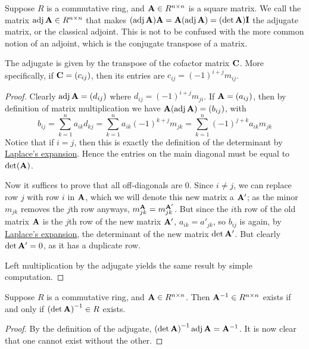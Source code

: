 \begin{definition}
    Suppose \(R\) is a commutative ring,
    and \(\vb{A} \in R^{n \times n}\) is a square matrix.
    We call the matrix \(\operatorname{adj}\vb{A} \in R^{n \times n}\)
    that makes \((\operatorname{adj}\vb{A})\vb{A} = \vb{A}(\operatorname{adj}\vb{A}) = (\det\vb{A})\vb{I}\)
    the adjugate matrix, or the classical adjoint.
    This is not to be confused with the more common notion of an adjoint,
    which is the conjugate transpose of a matrix.
\end{definition}
\begin{proposition}
    The adjugate is given by the transpose of the cofactor matrix \(\vb{C}\).
    More specifically, if \(\vb{C} = (c_{ij})\),
    then its entries are \(c_{ij} = {(-1)}^{i+j}m_{ij}\).
\end{proposition}
\begin{proof}
    Clearly \(\operatorname{adj}\vb{A} = (d_{ij})\)
    where \(d_{ij} = {(-1)}^{i+j}m_{ji}\).
    If \(\vb{A} = (a_{ij})\),
    then by definition of matrix multiplication we have
    \(\vb{A}(\operatorname{adj}\vb{A}) = (b_{ij})\), with
    \begin{equation*}
        b_{ij} = \sum_{k=1}^n a_{ik}d_{kj}
        = \sum_{k=1}^n a_{ik} {(-1)}^{k+j}m_{jk}
        = \sum_{k=1}^n {(-1)}^{j+k} a_{ik}m_{jk}
    \end{equation*}
    Notice that if \(i=j\),
    then this is exactly the definition of the determinant
    by \hyperref[thm:laplace-expansion-det]{Laplace's expansion}.
    Hence the entries on the main diagonal must be equal to \(\det(\vb{A})\).
    
    Now it suffices to prove that all off-diagonals are 0.
    Since \(i \neq j\), we can replace row \(j\) with row \(i\) in \(\vb{A}\),
    which we will denote this new matrix a \(\vb{A'}\);
    as the minor \(m_{jk}\) removes the \(j\)th row anyways,
    \(m_{jk}^{\vb{A}} = m_{jk}^{\vb{A'}}\).
    But since the \(i\)th row of the old matrix \(\vb{A}\)
    is the \(j\)th row of the new matrix \(\vb{A'}\),
    \(a_{ik} = a'_{jk}\), so \(b_{ij}\) is again,
    by \hyperref[thm:laplace-expansion-det]{Laplace's expansion},
    the determinant of the new matrix \(\det\vb{A'}\).
    But clearly \(\det\vb{A'} = 0\),
    as it has a duplicate row.

    Left multiplication by the adjugate yields the same result
    by simple computation.
\end{proof}

\begin{theorem}
    Suppose \(R\) is a commutative ring,
    and \(\vb{A} \in R^{n \times n}\).
    Then \(\vb{A}^{-1} \in R^{n \times n}\) exists
    if and only if \({(\det\vb{A})}^{-1} \in R\) exists.
\end{theorem}
\begin{proof}
    By the definition of the adjugate,
    \({(\det\vb{A})}^{-1} \operatorname{adj}\vb{A} = \vb{A}^{-1}\).
    It is now clear that one cannot exist without the other.
\end{proof}


